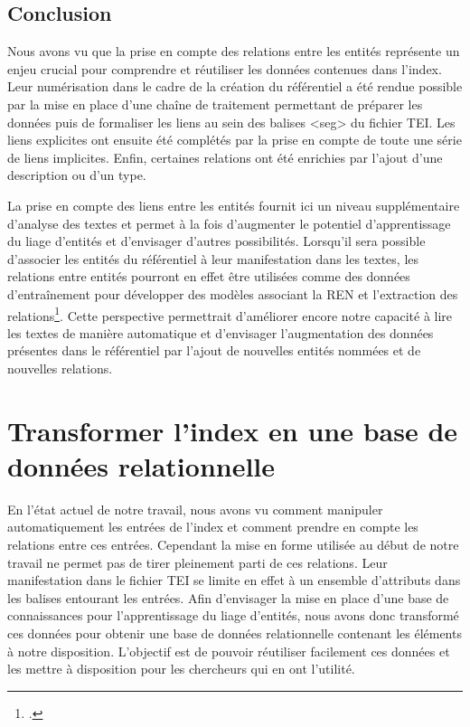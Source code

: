 \documentclass[a4paper,12pt,twoside]{book}
\begin{document}
	\section*{Conclusion}
	
	Nous avons vu que la prise en compte des relations entre les entités représente un enjeu crucial pour comprendre et réutiliser les données contenues dans l'index. Leur numérisation dans le cadre de la création du référentiel a été rendue possible par la mise en place d'une chaîne de traitement permettant de préparer les données puis de formaliser les liens au sein des balises <seg> du fichier TEI. Les liens explicites ont ensuite été complétés par la prise en compte de toute une série de liens implicites. Enfin, certaines relations ont été enrichies par l'ajout d'une description ou d'un type.
	
	La prise en compte des liens entre les entités fournit ici un niveau supplémentaire d'analyse des textes et permet à la fois d'augmenter le potentiel d'apprentissage du liage d'entités et d'envisager d'autres possibilités. Lorsqu'il sera possible d'associer les entités du référentiel à leur manifestation dans les textes, les relations entre entités pourront en effet être utilisées comme des données d'entraînement pour développer des modèles associant la REN et l'extraction des relations\footcite[p. 169--180]{dupont_structuration_2017}. Cette perspective permettrait d'améliorer encore notre capacité à lire les textes de manière automatique et d'envisager l'augmentation des données présentes dans le référentiel par l'ajout de nouvelles entités nommées et de nouvelles relations.
	
	\chapter{Transformer l’index en une base de données relationnelle}
	
	En l'état actuel de notre travail, nous avons vu comment manipuler automatiquement les entrées de l'index et comment prendre en compte les relations entre ces entrées. Cependant la mise en forme utilisée au début de notre travail ne permet pas de tirer pleinement parti de ces relations. Leur manifestation dans le fichier TEI se limite en effet à un ensemble d'attributs dans les balises entourant les entrées. Afin d'envisager la mise en place d'une base de connaissances pour l'apprentissage du liage d'entités, nous avons donc transformé ces données pour obtenir une base de données relationnelle contenant les éléments à notre disposition. L'objectif est de pouvoir réutiliser facilement ces données et les mettre à disposition pour les chercheurs qui en ont l'utilité.
	
\end{document}
